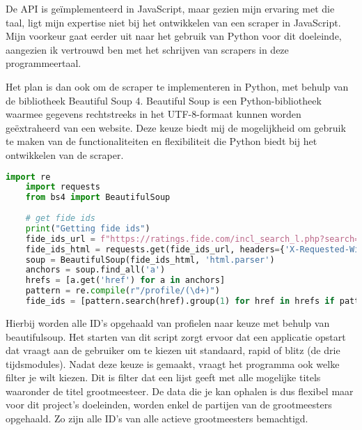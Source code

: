 De API is geïmplementeerd in JavaScript, maar gezien mijn ervaring met die taal, ligt mijn expertise niet bij het ontwikkelen van een scraper in JavaScript. Mijn voorkeur gaat eerder uit naar het gebruik van Python voor dit doeleinde, aangezien ik vertrouwd ben met het schrijven van scrapers in deze programmeertaal.

Het plan is dan ook om de scraper te implementeren in Python, met behulp van de bibliotheek Beautiful Soup 4. Beautiful Soup is een Python-bibliotheek waarmee gegevens rechtstreeks in het UTF-8-formaat kunnen worden geëxtraheerd van een website. Deze keuze biedt mij de mogelijkheid om gebruik te maken van de functionaliteiten en flexibiliteit die Python biedt bij het ontwikkelen van de scraper.\autocite{Richardson}

\begin{lstlisting}[language=Python]
    import re
    import requests
    from bs4 import BeautifulSoup
    
    # get fide ids
    print("Getting fide ids")
    fide_ids_url = f"https://ratings.fide.com/incl_search_l.php?search=&search_rating={rating}&search_country=all&search_title={title}&search_other_title=all&search_year=undefined&search_low=0&search_high=3500&search_inactive=on&search_exrated=off&search_radio=rating&search_bday_start=all&search_bday_end=all&search_radio=rating&search_asc=descending&search_gender=undefined&simple=0"
    fide_ids_html = requests.get(fide_ids_url, headers={'X-Requested-With': 'XMLHttpRequest'}).text
    soup = BeautifulSoup(fide_ids_html, 'html.parser')
    anchors = soup.find_all('a')
    hrefs = [a.get('href') for a in anchors]
    pattern = re.compile(r"/profile/(\d+)")
    fide_ids = [pattern.search(href).group(1) for href in hrefs if pattern.search(href)]
\end{lstlisting}

Hierbij worden alle ID's opgehaald van profielen naar keuze met behulp van beautifulsoup. Het starten van dit script zorgt ervoor dat een applicatie opstart dat vraagt aan de gebruiker om te kiezen uit standaard, rapid of blitz (de drie tijdsmodules). Nadat deze keuze is gemaakt, vraagt het programma ook welke filter je wilt kiezen. Dit is filter dat een lijst geeft met alle mogelijke titels waaronder de titel grootmeesteer. De data die je kan ophalen is dus flexibel maar voor dit project's doeleinden, worden enkel de partijen van de grootmeesters opgehaald. Zo zijn alle ID's van alle actieve grootmeesters bemachtigd.

